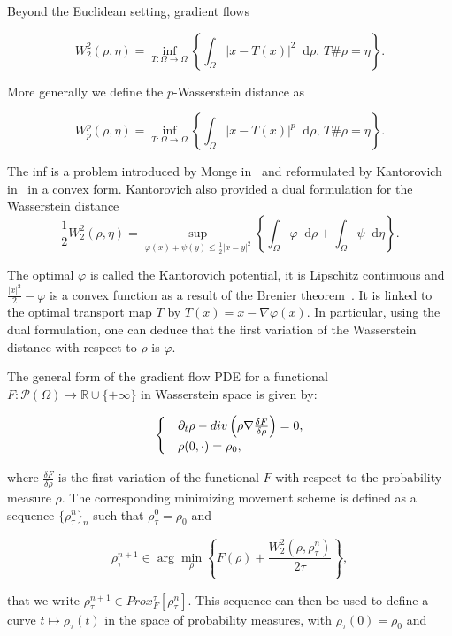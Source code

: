 \documentclass[a4paper,twosided, 11pt]{article}
\newcommand{\R}{\mathbb{R}}
\newcommand {\Div}  { {\rm div} }
\newcommand {\f}   {\frac}
\theoremstyle{plain}
\theoremstyle{remark}
\newcommand{\diff}{\mathop{}\!\mathrm{d}}
\numberwithin{equation}{section}
\begin{document}
Beyond the Euclidean setting, gradient flows
\fi

 
$$
W_{2}^2(\rho,\eta) = \inf_{T:\Omega\to\Omega}\left\{\int_{\Omega}|x-T(x)|^2\diff \rho, \, T\#\rho=\eta\right\}.
$$

More generally we define the $p$-Wasserstein distance as

$$
W_{p}^p(\rho,\eta) = \inf_{T:\Omega\to\Omega}\left\{\int_{\Omega}|x-T(x)|^p\diff \rho, \, T\#\rho=\eta\right\}.
$$



The inf is a problem introduced by Monge in~\cite{monge1781memoire} and reformulated by Kantorovich in~\cite{kantorovich1942transfer} in a convex form. Kantorovich also provided a dual formulation for the Wasserstein distance
$$
\f{1}{2}W_{2}^2(\rho,\eta) = \sup_{\varphi(x)+\psi(y)\le \f{1}{2}|x-y|^2}\left\{\int_{\Omega}\varphi\diff \rho +\int_{\Omega}\psi \diff \eta\right\}.
$$

The optimal $\varphi$ is called the Kantorovich potential, it is Lipschitz continuous and $\f{|x|^2}{2}-\varphi$ is a convex function as a result of the Brenier theorem~\cite{brenier1987decomposition,brenier1991polar}. It is linked to the optimal transport map $T$ by $T(x) = x - \nabla\varphi(x)$. In particular, using the dual formulation, one can deduce that the first variation of the Wasserstein distance with respect to $\rho$ is $\varphi$.

The general form of the gradient flow PDE for a functional $F:\mathcal{P}(\Omega)\to \R\cup\{+\infty\}$ in Wasserstein space is given by:

$$
\begin{cases}
&\partial_t \rho - \Div  \left( \rho \nabla \frac{\delta F}{\delta \rho} \right) = 0,\\
&\rho(0,\cdot) = \rho_{0},
\end{cases}
$$

where $\frac{\delta F}{\delta \rho}$ is the first variation of the functional $F$ with respect to the probability measure $\rho$. The corresponding minimizing movement scheme is defined as a sequence $\{\rho_\tau^n\}_{n}$ such that $\rho_{\tau}^{0}= \rho_{0}$ and

\[
\rho_\tau^{n+1} \in \arg\min_{\rho} \left\{ F(\rho) + \frac{W_2^2(\rho, \rho_\tau^n)}{2\tau} \right\}, 
\]

that we write $\rho^{n+1}_{\tau}\in Prox_{F}^{\tau}[\rho^{n}_{\tau}]$. This sequence can then be used to define a curve \( t \mapsto \rho_\tau(t) \) in the space of probability measures, with \(\rho_\tau(0) = \rho_0\) and 
\end{document}
